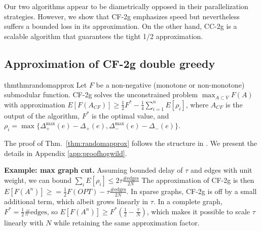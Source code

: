 \documentclass{article} %
\newcommand{\hogwild}{CF-2g}
\newcommand{\occ}{CC-2g}
\newcommand{\hogwildshort}{CF}
\newcommand{\Comments}{1}
\newcommand{\note}[2]{\ifnum\Comments=1\textcolor{#1}{#2}\fi}
\newcommand{\xinghao}[1]{\note{red}{[XP: #1]}}
\newcommand{\thmref}[1]{Thm.~\ref{#1}}
\begin{document}

Our two algorithms appear to be diametrically opposed in their parallelization strategies.
However, we show that \hogwild{} emphasizes speed but nevertheless suffers a bounded loss in its approximation.
On the other hand, \occ{} is a scalable algorithm that guarantees the tight 1/2 approximation.


\subsection{Approximation of \hogwild{} double greedy \label{sec:analysis:hogwild}}

\begin{restatable}{thm}{thmrandomapprox}\label{thm:randomapprox} Let $F$ be a non-negative (monotone or non-monotone) submodular function.
\hogwild{} solves the unconstrained problem $\max_{A\subset V} F(A)$ with approximation
$
E[F(A_{\hogwildshort{}})] \geq \frac{1}{2}F^* - \frac{1}{4}\sum_{i=1}^n E[\rho_i]$,
where $A_{\hogwildshort{}}$ is the output of the algorithm, $F^*$ is the optimal value, and $\rho_i = \max\{\Delta_+^{\max}(e) - \Delta_+(e), \Delta_-^{\max}(e) - \Delta_-(e)\}$.
\end{restatable}

The proof of \thmref{thm:randomapprox} follows the structure in \cite{buchbinder2012}. We present the details in Appendix \ref{app:proofhogwild}.



\textbf{Example: max graph cut.}
Assuming bounded delay of $\tau$ and edges with unit weight, we can bound $\sum_i E[\rho_i] \leq 2\tau\frac{\text{\#edges}}{2N}$
The approximation of \hogwild{} is then $E[F(A^n)] \geq = \frac{1}{2} F(OPT) - \tau\frac{\#\text{edges}}{2N}$.
In sparse graphs, \hogwild{} is off by a small additional term, which albeit grows linearly in $\tau$.
In a complete graph, $F^* = \frac{1}{2}\#\text{edges}$, so $E[F(A^n)] \geq F^*\left(\frac{1}{2} - \frac{\tau}{N}\right)$, which makes it possible to scale $\tau$ linearly with $N$ while retaining the same approximation factor.
\end{document}
